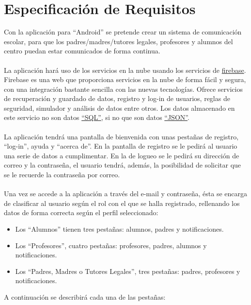%
%
%
%

\cleardoublepage
\chapter{Especificaci\'on de Requisitos}
\label{chap:requirements}

Con la aplicaci\'on \CollegeApp para ``Android'' se pretende crear un sistema de comunicaci\'on escolar, para que los padres/madres/tutores legales, profesores y alumnos del centro puedan estar comunicados de forma continua.\\
\\ 
La aplicaci\'on har\'a uso de los servicios en la nube usando los servicios de \href{https://www.firebase.com/}{firebase}.
Firebase es una web que proporciona servicios en la nube de forma f\'acil y segura, con una integraci\'on bastante sencilla con las nuevas tecnolog\'ias. Ofrece servicios de recuperaci\'on y guardado de datos, registro y log-in de usuarios, reglas de seguridad, simulador y an\'alisis de datos entre otros. Los datos almacenado en este servicio no son datos \href{http://es.wikipedia.org/wiki/SQL}{``SQL''}, si no que son datos \href{http://es.wikipedia.org/wiki/JSON}{``JSON''}.\\
\\
La aplicaci\'on tendr\'a una pantalla de bienvenida con unas pesta\~nas de registro, ``log-in'', ayuda y ``acerca de''. En la pantalla de registro se le pedir\'a al usuario una serie de datos a cumplimentar. En la de logueo se le pedirá su direcci\'on de correo y la contrase\~na, el usuario tendr\'a, adem\'as, la posibilidad de solicitar que se le recuerde la contrase\~na por correo.\\
\\
Una vez se accede a la aplicaci\'on a trav\'es del e-mail y contrase\~na, \'esta se encarga de clasificar al usuario seg\'un el rol con el que se halla registrado, rellenando los datos de forma correcta seg\'un el perfil seleccionado:
\begin{itemize}
	\item Los ``Alumnos'' tienen tres pesta\~nas: alumnos, padres y notificaciones.
	\item Los ``Profesores'', cuatro pesta\~nas: profesores, padres, alumnos y notificaciones.
	\item Los ``Padres, Madres o Tutores Legales'', tres pesta\~nas: padres, profesores y notificaciones.\linebreak
\end{itemize}A continuaci\'on se describir\'a cada una de las pesta\~nas:
